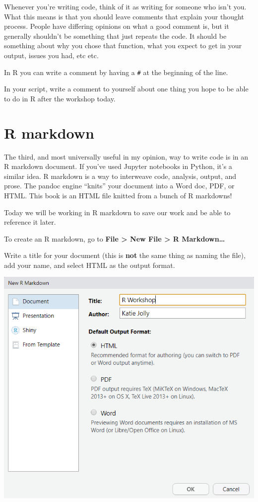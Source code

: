 \documentclass[]{book}
\begin{document}
Whenever you're writing code, think of it as writing for someone who
isn't you. What this means is that you should leave comments that
explain your thought process. People have differing opinions on what a
good comment is, but it generally shouldn't be something that just
repeats the code. It should be something about why you chose that
function, what you expect to get in your output, issues you had, etc
etc.

In R you can write a comment by having a \texttt{\#} at the beginning of
the line.

In your script, write a comment to yourself about one thing you hope to
be able to do in R after the workshop today.

\section{R markdown}\label{r-markdown}

The third, and most universally useful in my opinion, way to write code
is in an R markdown document. If you've used Jupyter notebooks in
Python, it's a similar idea. R markdown is a way to interweave code,
analysis, output, and prose. The pandoc engine ``knits'' your document
into a Word doc, PDF, or HTML. This book is an HTML file knitted from a
bunch of R markdowns!

Today we will be working in R markdown to save our work and be able to
reference it later.

To create an R markdown, go to \textbf{File \textgreater{} New File
\textgreater{} R Markdown\ldots{}}

Write a title for your document (this is \textbf{not} the same thing as
naming the file), add your name, and select HTML as the output format.

\includegraphics[width=9.19in]{images/03-04-newmarkdown}
\end{document}
